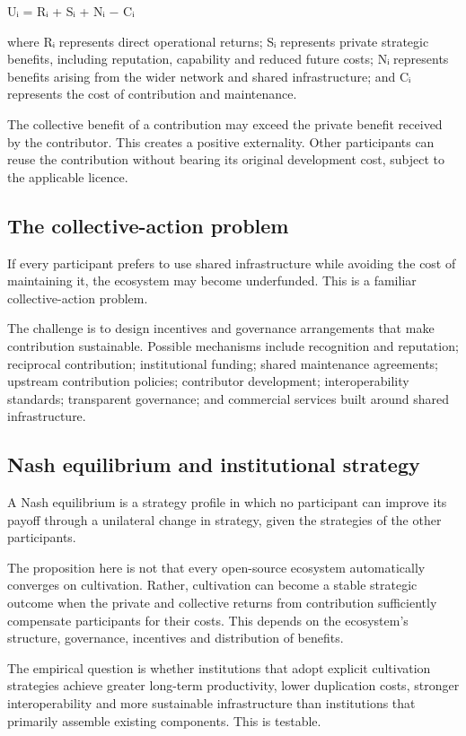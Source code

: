 \documentclass[11pt,a4paper]{article}
\begin{document}
Uᵢ = Rᵢ + Sᵢ + Nᵢ − Cᵢ

where Rᵢ represents direct operational returns; Sᵢ represents private strategic benefits, including reputation, capability and reduced future costs; Nᵢ represents benefits arising from the wider network and shared infrastructure; and Cᵢ represents the cost of contribution and maintenance.

The collective benefit of a contribution may exceed the private benefit received by the contributor. This creates a positive externality. Other participants can reuse the contribution without bearing its original development cost, subject to the applicable licence.

\subsection{The collective-action problem}
If every participant prefers to use shared infrastructure while avoiding the cost of maintaining it, the ecosystem may become underfunded. This is a familiar collective-action problem.

The challenge is to design incentives and governance arrangements that make contribution sustainable. Possible mechanisms include recognition and reputation; reciprocal contribution; institutional funding; shared maintenance agreements; upstream contribution policies; contributor development; interoperability standards; transparent governance; and commercial services built around shared infrastructure.

\subsection{Nash equilibrium and institutional strategy}
A Nash equilibrium is a strategy profile in which no participant can improve its payoff through a unilateral change in strategy, given the strategies of the other participants.

The proposition here is not that every open-source ecosystem automatically converges on cultivation. Rather, cultivation can become a stable strategic outcome when the private and collective returns from contribution sufficiently compensate participants for their costs. This depends on the ecosystem's structure, governance, incentives and distribution of benefits.

The empirical question is whether institutions that adopt explicit cultivation strategies achieve greater long-term productivity, lower duplication costs, stronger interoperability and more sustainable infrastructure than institutions that primarily assemble existing components. This is testable.
\end{document}
